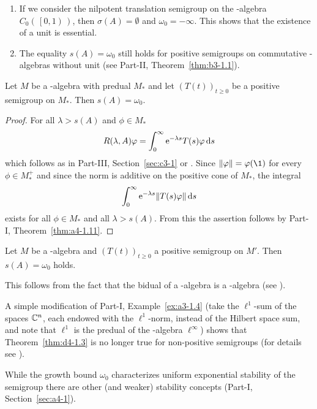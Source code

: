 \begin{remark}\label{rem:d4-1.2}
\begin{enumerate}[\upshape (i), wide, labelindent=.25em]
\item
If we consider the nilpotent translation semigroup on the \CA-algebra $C_{0}(\,\left[0,1\right)\,)$, then $\sigma(A) = \emptyset$ and $\omega_{0} = -\infty$.
This shows that the existence of a unit is essential.

\item
The equality $s(A) = \omega_{0}$ still holds for positive semigroups on commutative \CA-algebras without unit 
(see Part-II, Theorem~\ref{thm:b3-1.1}).
\end{enumerate}
\end{remark}
\begin{theorem}\label{thm:d4-1.3}
Let $M$ be a \WA-algebra with predual $M_{*}$ and let $(T(t))_{t \geq 0}$ be a positive semigroup on $M_{*}$.
Then $s(A) = \omega_{0}$.
\end{theorem}
\begin{proof}
For all $\lambda > s(A)$ and $\phi \in M_{*}$
\[
R(\lambda,A)\phi = \int_{0}^{\infty} \eu^{-\lambda s}T(s)\phi \ds
\]
which follows as in Part-III, Section~\ref{sec:c3-1} or \textcite[Theorem 3]{greinervoigtwolff:1981}.
Since $\|\phi\| = \phi(\1)$ for every $\phi \in M_{*}^{+}$ and since the norm is additive on the positive cone of\/ $M_{*}$, the integral
\[
	\int_{0}^{\infty} \eu^{-\lambda s}\|T(s)\phi\| \ds
\]
exists for all $\phi \in M_{*}$ and all $\lambda > s(A)$.
From this the assertion follows by Part-I, Theorem~\ref{thm:a4-1.11}.
\end{proof}
\begin{corollary}\label{cor:d4-1.4}
Let $M$ be a \CA-algebra and $(T(t))_{t \geq 0}$ a positive semigroup on $M'$.
Then $s(A) = \omega_{0}$ holds.
\end{corollary}
\noindent This follows from the fact that the bidual of a \CA-algebra is a \WA-algebra (see \textcite[Theorem III.2.4.]{takesaki:1979}).
\begin{remark}\label{rem:d4-1.5}
A simple modification of Part-I, Example~\ref{ex:a3-1.4} (take the $\ell^{1}$-sum of the spaces $\mathbb{C}^{n}$, each endowed with the $\ell^{1}$-norm, instead of the Hilbert space sum, and note that $\ell^{1}$ is the predual of the \WA-algebra $\ell^{\infty}$) shows that Theorem~\ref{thm:d4-1.3} is no longer true for non-positive semigroups (for details see \textcite[Beispiel 2.5]{grohneubrander:1981}).

While the growth bound $\omega_{0}$ characterizes uniform exponential stability of the semigroup there are other (and weaker) stability concepts (\cf Part-I, Section~\ref{sec:a4-1}).
\end{remark}
